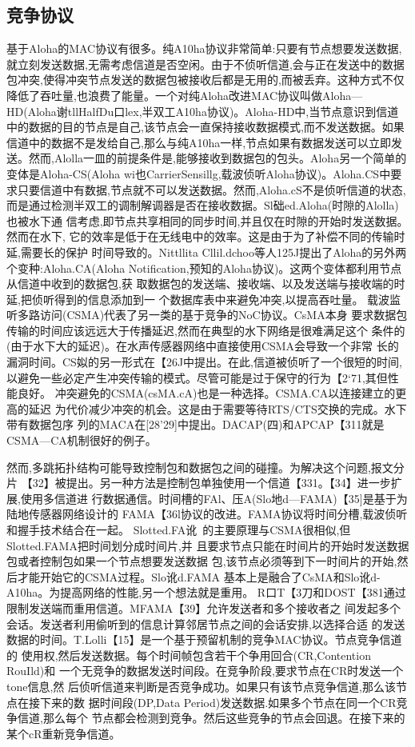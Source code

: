 \subsection{竞争协议}
基于Aloha的MAC协议有很多。纯A10ha协议非常简单:只要有节点想要发送数据,就立刻发送数据,无需考虑信道是否空闲。由于不侦听信道,会与正在发送中的数据包冲突,使得冲突节点发送的数据包被接收后都是无用的,而被丢弃。这种方式不仅降低了吞吐量,也浪费了能量。一个对纯Aloha改进MAC协议叫做Aloha—HD(Aloha谢tllHalfDu口lex,半双工A10ha协议)。Aloha-HD中,当节点意识到信道中的数据的目的节点是自己,该节点会一直保持接收数据模式,而不发送数据。如果信道中的数据不是发给自己,那么与纯A10ha一样,节点如果有数据发送可以立即发送。然而,Alolla一皿的前提条件是,能够接收到数据包的包头。Aloha另一个简单的变体是Aloha-CS(Aloha wi也CarrierSensillg,载波侦听Aloha协议)。Aloha.CS中要求只要信道中有数据,节点就不可以发送数据。然而,Aloha.cS不是侦听信道的状态,而是通过检测半双工的调制解调器是否在接收数据。Sl础ed.Aloha(时隙的Alolla)也被水下通
信考虑,即节点共享相同的同步时间,并且仅在时隙的开始时发送数据。然而在水下,
它的效率是低于在无线电中的效率。这是由于为了补偿不同的传输时延,需要长的保护
时间导致的。Nittllita Cllil.dchoo等人125J提出了Aloha的另外两个变种:Aloha.CA(Aloha
Notification,预知的Aloha协议)。这两个变体都利用节点从信道中收到的数据包,获
取数据包的发送端、接收端、以及发送端与接收端的时延,把侦听得到的信息添加到一
个数据库表中来避免冲突,以提高吞吐量。
载波监听多路访问(CSMA)代表了另一类的基于竞争的NoC协议。CsMA本身
要求数据包传输的时间应该远远大于传播延迟,然而在典型的水下网络是很难满足这个
条件的(由于水下大的延迟)。在水声传感器网络中直接使用CSMA会导致一个非常
长的漏洞时间。CS姒的另一形式在【26J中提出。在此,信道被侦听了一个很短的时间,
以避免一些必定产生冲突传输的模式。尽管可能是过于保守的行为【2‘71,其但性能良好。
冲突避免的CSMA(csMA.cA)也是一种选择。CSMA.CA以连接建立的更高的延迟
为代价减少冲突的机会。这是由于需要等待RTS/CTS交换的完成。水下带有数据包序
列的MACA在[28'29]中提出。DACAP(四)和APCAP【311就是CSMA—CA机制很好的例子。

然而,多跳拓扑结构可能导致控制包和数据包之间的碰撞。为解决这个问题,报文分片
【32】被提出。另一种方法是控制包单独使用一个信道【331。【34】进一步扩展,使用多信道进
行数据通信。时间槽的FAl、压A(Slo地d—FAMA)【35]是基于为陆地传感器网络设计的
FAMA【36l协议的改进。FAMA协议将时间分槽,载波侦听和握手技术结合在一起。
Slotted.FA讹~的主要原理与CSMA很相似,但Slotted.FAMA把时间划分成时间片,并
且要求节点只能在时间片的开始时发送数据包或者控制包如果一个节点想要发送数据
包,该节点必须等到下一时间片的开始,然后才能开始它的CSMA过程。Slo讹d.FAMA
基本上是融合了CsMA和Slo讹d-A10ha。为提高网络的性能,另一个想法就是重用。
R口T【3刀和DOST【381通过限制发送端而重用信道。MFAMA【39】允许发送者和多个接收者之
间发起多个会话。发送者利用偷听到的信息计算邻居节点之间的会话安排,以选择合适
的发送数据的时间。T.Lolli【15】是一个基于预留机制的竞争MAC协议。节点竞争信道的
使用权,然后发送数据。每个时间帧包含若干个争用回合(CR,Contention RouIld)和
一个无竞争的数据发送时间段。在竞争阶段,要求节点在CR时发送一个tone信息,然
后侦听信道来判断是否竞争成功。如果只有该节点竞争信道,那么该节点在接下来的数
据时间段(DP,Data Period)发送数据.如果多个节点在同一个CR竞争信道,那么每个
节点都会检测到竞争。然后这些竞争的节点会回退。在接下来的某个cR重新竞争信道。

